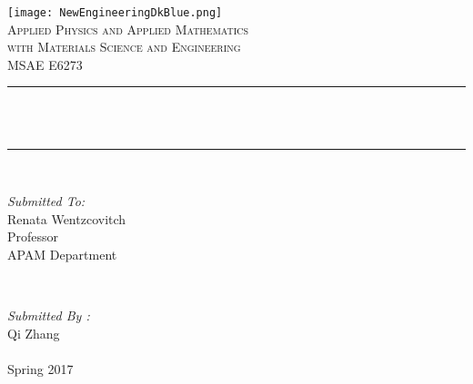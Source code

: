 
\begin{titlepage}
	\centering
	\vspace*{0.5 cm}
	\texttt{[image: NewEngineeringDkBlue.png]}\\[1.0 cm]	%
	\textsc{\Large Applied Physics and Applied Mathematics\\
		\large with Materials Science and Engineering}\\[2.0 cm]	%
	\textsc{\Large MSAE E6273}\\[0.5 cm]				%
	\rule{\linewidth}{0.2 mm} \\[0.4 cm]
	{ \huge \bfseries \thetitle}\\
	\rule{\linewidth}{0.2 mm} \\[1.5 cm]

	\begin{minipage}{0.4\textwidth}
		\begin{flushleft} \large
			\emph{Submitted To:}\\
			Renata Wentzcovitch\\
			Professor\\
			APAM Department\\
		\end{flushleft}
	\end{minipage}~
	\begin{minipage}{0.4\textwidth}

		\begin{flushright} \large
			\emph{Submitted By :} \\
			Qi Zhang\\
			\\
			Spring 2017\\
		\end{flushright}

	\end{minipage}\\[2 cm]
\end{titlepage}
